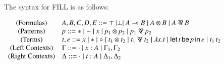 \documentclass{elsarticle}
\newcommand{\FILLnt}[1]{\mathit{#1}}
\newcommand{\FILLmv}[1]{\mathit{#1}}
\newcommand{\FILLsym}[1]{#1}
\begin{document}
\begin{definition}
  \label{def:syntax}
  The syntax for FILL is as follows:
  \begin{center}
    \begin{math}
      \begin{array}{cll}
        \text{(Formulas)}       & \FILLnt{A}, \FILLnt{B}, \FILLnt{C}, \FILLnt{D}, \FILLnt{E} ::=  \top  \mid  \perp 
        \mid  \FILLnt{A}  \multimap   \FILLnt{B}  \mid  \FILLnt{A}  \otimes  \FILLnt{B}  \mid  \FILLnt{A}  \parr  \FILLnt{B}  \\
        \text{(Patterns)} & \FILLnt{p} ::=  *  \mid  -  \mid \FILLmv{x} \mid  \FILLnt{p_{{\mathrm{1}}}}  \otimes  \FILLnt{p_{{\mathrm{2}}}}  \mid  \FILLnt{p_{{\mathrm{1}}}}  \parr  \FILLnt{p_{{\mathrm{2}}}} \\
        \text{(Terms)}          & \FILLnt{t}, \FILLnt{e} ::= \FILLmv{x} \mid \FILLsym{*} \mid  \circ  \mid
         \FILLnt{t_{{\mathrm{1}}}}  \otimes  \FILLnt{t_{{\mathrm{2}}}}  \mid  \FILLnt{t_{{\mathrm{1}}}}  \parr  \FILLnt{t_{{\mathrm{2}}}}  \mid  \lambda  \FILLmv{x}  .  \FILLnt{t}  \mid  \mathsf{let}\, \FILLnt{t} \,\mathsf{be}\, \FILLnt{p} \,\mathsf{in}\, \FILLnt{e}  \mid \FILLnt{t_{{\mathrm{1}}}} \, \FILLnt{t_{{\mathrm{2}}}}\\
        \text{(Left Contexts)}  & \Gamma ::=  \cdot  \mid \FILLmv{x}  \FILLsym{:}  \FILLnt{A} \mid \Gamma_{{\mathrm{1}}}  \FILLsym{,}  \Gamma_{{\mathrm{2}}}\\
        \text{(Right Contexts)} & \Delta ::=  \cdot  \mid \FILLnt{t}  \FILLsym{:}  \FILLnt{A} \mid \Delta_{{\mathrm{1}}}  \FILLsym{,}  \Delta_{{\mathrm{2}}}\\
      \end{array}
    \end{math}
  \end{center}
\end{definition}
\end{document}

